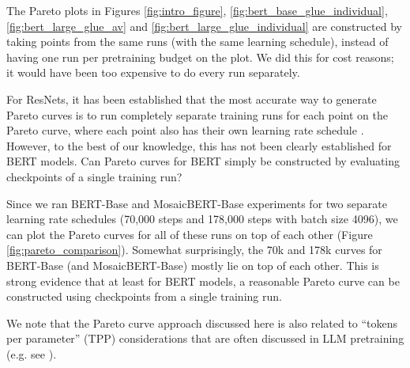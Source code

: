 The Pareto plots in Figures \ref{fig:intro_figure}, \ref{fig:bert_base_glue_individual}, \ref{fig:bert_large_glue_av} and \ref{fig:bert_large_glue_individual} are constructed by taking points from the same runs (with the same learning schedule), instead of having one run per pretraining budget on the plot. We did this for cost reasons; it would have been too expensive to do every run separately. 

For ResNets, it has been established that the most accurate way to generate Pareto curves is to run completely separate training runs for each point on the Pareto curve, where each point also has their own learning rate schedule \citep{portes2022fast}. However, to the best of our knowledge, this has not been clearly established for BERT models. Can Pareto curves for BERT simply be constructed by evaluating checkpoints of a single training run?

Since we ran BERT-Base and MosaicBERT-Base experiments for two separate learning rate schedules (70,000 steps and 178,000 steps with batch size 4096), we can plot the Pareto curves for all of these runs on top of each other (Figure \ref{fig:pareto_comparison}). Somewhat surprisingly, the 70k and 178k curves for BERT-Base (and MosaicBERT-Base) mostly lie on top of each other. This is strong evidence that at least for BERT models, a reasonable Pareto curve can be constructed using checkpoints from a single training run.

We note that the Pareto curve approach discussed here is also related to ``tokens per parameter'' (TPP) considerations that are often discussed in LLM pretraining (e.g. see \citep{dey2023btlm}).




